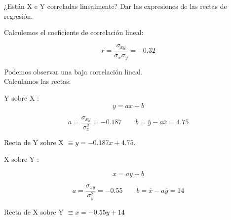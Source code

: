 \subproblem 
¿Están X e Y correladas linealmente? Dar las expresiones de las rectas de regresión.

Calculemos el coeficiente de correlación lineal:

$$r =  \dfrac{\sigma_{xy}}{\sigma_x \sigma_y} = -0.32$$

Podemos observar una baja correlación lineal.\\

Calculamos las rectas:

Y sobre X : 
$$y = ax + b$$

$$a = \dfrac{\sigma_{xy}}{\sigma_x^2} = -0.187 \qquad b = \overline{y} - a\overline{x} = 4.75 $$

Recta de Y sobre X $\equiv y = -0.187x + 4.75$.

\hspace{2em}

X sobre Y :

$$x = ay + b$$

$$a = \dfrac{\sigma_{xy}}{\sigma_y^2} = -0.55 \qquad b = \overline{x} - a\overline{y} = 14 $$

Recta de X sobre Y $\equiv x = -0.55y + 14$ 
